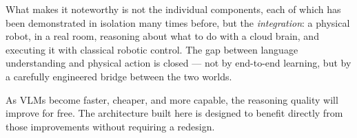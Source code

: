 What makes it noteworthy is not the individual components, each of which has been
demonstrated in isolation many times before, but the \emph{integration}: a physical
robot, in a real room, reasoning about what to do with a cloud brain, and executing it
with classical robotic control.
The gap between language understanding and physical action is closed --- not by
end-to-end learning, but by a carefully engineered bridge between the two worlds.

As VLMs become faster, cheaper, and more capable, the reasoning quality will improve
for free.
The architecture built here is designed to benefit directly from those improvements
without requiring a redesign.
